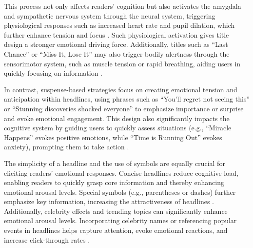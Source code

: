 This process not only affects readers’ cognition but also activates the amygdala and sympathetic nervous system through the neural system, triggering physiological responses such as increased heart rate and pupil dilation, which further enhance tension and focus \cite{panksepp2012archeology, calvo2010affect}. Such physiological activation gives title design a stronger emotional driving force. Additionally, titles such as “Last Chance” or “Miss It, Lose It” may also trigger bodily alertness through the sensorimotor system, such as muscle tension or rapid breathing, aiding users in quickly focusing on information \cite{james1884mind}.

In contrast, suspense-based strategies focus on creating emotional tension and anticipation within headlines, using phrases such as “You’ll regret not seeing this” or “Stunning discoveries shocked everyone” to emphasize importance or surprise and evoke emotional engagement. This design also significantly impacts the cognitive system by guiding users to quickly assess situations (e.g., “Miracle Happens” evokes positive emotions, while “Time is Running Out” evokes anxiety), prompting them to take action \cite{lazarus1991emotion}.

The simplicity of a headline and the use of symbols are equally crucial for eliciting readers’ emotional responses. Concise headlines reduce cognitive load, enabling readers to quickly grasp core information and thereby enhancing emotional arousal levels. Special symbols (e.g., parentheses or dashes) further emphasize key information, increasing the attractiveness of headlines \cite{kourogi2015identifying}. Additionally, celebrity effects and trending topics can significantly enhance emotional arousal levels. Incorporating celebrity names or referencing popular events in headlines helps capture attention, evoke emotional reactions, and increase click-through rates \cite{kim2016compete}.

